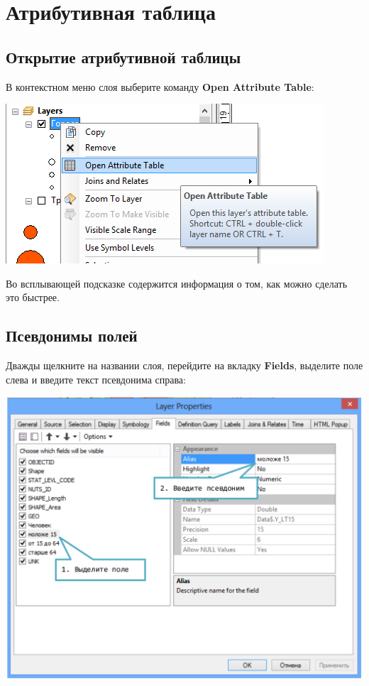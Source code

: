 \documentclass[]{book}
\theoremstyle{definition}
\theoremstyle{definition}
\theoremstyle{definition}
\theoremstyle{remark}
\begin{document}
\hypertarget{manual-attributes}{%
\chapter{Атрибутивная таблица}\label{manual-attributes}}

\hypertarget{--}{%
\section{Открытие атрибутивной таблицы}\label{--}}

В контекстном меню слоя выберите команду \textbf{Open Attribute Table}:

\includegraphics{images/Appendix/image68.png}

Во всплывающей подсказке содержится информация о том, как можно сделать
это быстрее.

\hypertarget{-}{%
\section{Псевдонимы полей}\label{-}}

Дважды щелкните на названии слоя, перейдите на вкладку \textbf{Fields},
выделите поле слева и введите текст псевдонима справа:

\includegraphics{images/Appendix/image69.png}
\end{document}
